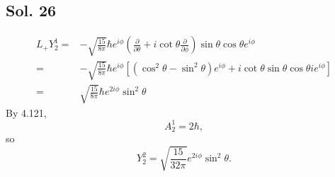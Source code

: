    \subsection*{Sol. 26}
   \begin{align*}
       L_+Y^{1}_2 =& -\sqrt{\frac{15}{8\pi}}
       \hbar e^{i\phi}
       \left(\frac{\partial}{\partial\theta}
       +i\cot\theta 
       \frac{\partial}{\partial\phi}\right)
       \sin\theta \cos\theta e^{i\phi}\\
       =&
       -\sqrt{\frac{15}{8\pi}}
       \hbar e^{i\phi}
       [(\cos^2\theta -\sin^2\theta)e^{i\phi}
       +i\cot\theta 
       \sin\theta \cos\theta ie^{i\phi}
       ]\\
       =&
       \sqrt{\frac{15}{8\pi}}
       \hbar e^{2i\phi}
       \sin^2\theta 
   \end{align*}
   By 4.121, 
   $$
   A^1_2 = 
   2\hbar,
   $$
   so 
   $$
    Y^2_2
    =\sqrt{\frac{15}{32\pi}}
    e^{2i\phi}
    \sin^2\theta.
   $$

